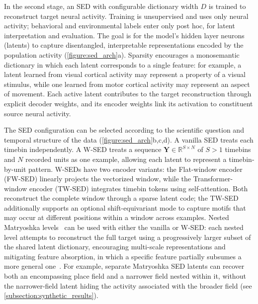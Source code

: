In the second stage, an SED with configurable dictionary width $D$ is trained to reconstruct target neural activity. Training is unsupervised and uses only neural activity; behavioral and environmental labels enter only post hoc, for latent interpretation and evaluation. The goal is for the model's hidden layer neurons (latents) to capture disentangled, interpretable representations encoded by the population activity (\autoref{figure:sed_arch}a). Sparsity encourages a monosemantic dictionary in which each latent corresponds to a single feature: for example, a latent learned from visual cortical activity may represent a property of a visual stimulus, while one learned from motor cortical activity may represent an aspect of movement. Each active latent contributes to the target reconstruction through explicit decoder weights, and its encoder weights link its activation to constituent source neural activity.

The SED configuration can be selected according to the scientific question and temporal structure of the data (\autoref{figure:sed_arch}b,c,d). A vanilla SED treats each timebin independently. A W-SED treats a sequence $\mathbf{Y}\in\mathbb{R}^{S\times N}$ of $S > 1$ timebins and $N$ recorded units as one example, allowing each latent to represent a timebin-by-unit pattern. W-SEDs have two encoder variants: the Flat-window encoder (FW-SED) linearly projects the vectorized window, while the Transformer-window encoder (TW-SED) integrates timebin tokens using self-attention. Both reconstruct the complete window through a sparse latent code; the TW-SED additionally supports an optional shift-equivariant mode to capture motifs that may occur at different positions within a window across examples. Nested Matryoshka levels~\citep{bussmann_2025_msae} can be used with either the vanilla or W-SED: each nested level attempts to reconstruct the full target using a progressively larger subset of the shared latent dictionary, encouraging multi-scale representations and mitigating feature absorption, in which a specific feature partially subsumes a more general one~\citep{chanin_2024_feature_absorption}. For example, separate Matryoshka SED latents can recover both an encompassing place field and a narrower field nested within it, without the narrower-field latent hiding the activity associated with the broader field (see \hyperref[subsection:synthetic_results]{\ref*{subsection:synthetic_results}}).

